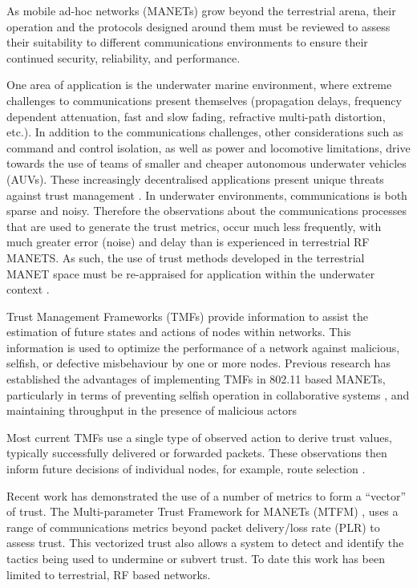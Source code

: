 As mobile ad-hoc networks (MANETs) grow beyond the terrestrial arena, their operation and the protocols designed around them must be reviewed to assess their suitability to different communications environments to ensure their continued security, reliability, and performance.

One area of application is the underwater marine environment, where extreme challenges to communications present themselves (propagation delays, frequency dependent attenuation, fast and slow fading, refractive multi-path distortion, etc.).
In addition to the communications challenges, other considerations such as command and control isolation, as well as power and locomotive limitations, drive towards the use of teams of smaller and cheaper autonomous underwater vehicles (AUVs). 
These increasingly decentralised applications present unique threats against trust management \cite{Caiti2011}.
In underwater environments, communications is both sparse and noisy.
Therefore the observations about the communications processes that are used to generate the trust metrics, occur much less frequently, with much greater error (noise) and delay than is experienced in terrestrial RF MANETS.
As such, the use of trust methods developed in the terrestrial MANET space must be re-appraised for application within the underwater context \cite{Pavan2015}.

Trust Management Frameworks (TMFs) provide information to assist the estimation of future states and actions of nodes within networks.
This information is used to optimize the performance of a network against malicious, selfish, or defective misbehaviour by one or more nodes.
Previous research has established the advantages of implementing TMFs in 802.11 based MANETs, particularly in terms of preventing selfish operation in collaborative systems \cite{Li2007}, and maintaining throughput in the presence of malicious actors \cite{Buchegger2002}

Most current TMFs use a single type of observed action to derive trust values, typically successfully delivered or forwarded packets. 
These observations then inform future decisions of individual nodes, for example, route selection \cite{Li2008}.

Recent work has demonstrated the use of a number of metrics to form a ``vector'' of trust.
The Multi-parameter Trust Framework for MANETs (MTFM) \cite{Guo11}, uses a range of communications metrics beyond packet delivery/loss rate (PLR) to assess trust.
This vectorized trust also allows a system to detect and identify the tactics being used to undermine or subvert trust.
To date this work has been limited to terrestrial, RF based networks. 

